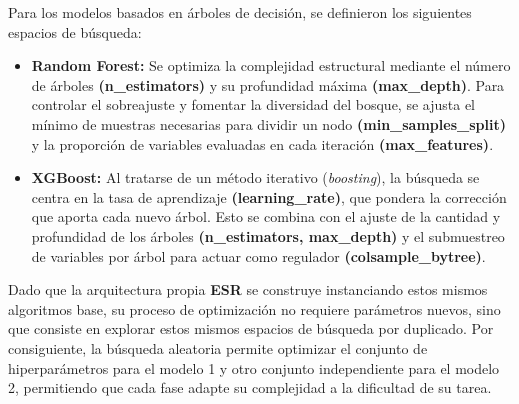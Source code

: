 Para los modelos basados en árboles de decisión, se definieron los siguientes espacios de búsqueda:
\begin{itemize}
	\item \textbf{Random Forest:} Se optimiza la complejidad estructural mediante el número de árboles \textbf{(n\_estimators)} y su profundidad máxima \textbf{(max\_depth)}. Para controlar el sobreajuste y fomentar la diversidad del bosque, se ajusta el mínimo de muestras necesarias para dividir un nodo \textbf{(min\_samples\_split)} y la proporción de variables evaluadas en cada iteración \textbf{(max\_features)}.
	\item \textbf{XGBoost:} Al tratarse de un método iterativo (\textit{boosting}), la búsqueda se centra en la tasa de aprendizaje \textbf{(learning\_rate)}, que pondera la corrección que aporta cada nuevo árbol. Esto se combina con el ajuste de la cantidad y profundidad de los árboles \textbf{(n\_estimators, max\_depth)} y el submuestreo de variables por árbol para actuar como regulador \textbf{(colsample\_bytree)}.
\end{itemize}
Dado que la arquitectura propia \textbf{ESR} se construye instanciando estos mismos algoritmos base, su proceso de optimización no requiere parámetros nuevos, sino que consiste en explorar estos mismos espacios de búsqueda por duplicado. Por consiguiente, la búsqueda aleatoria permite optimizar el conjunto de hiperparámetros para el modelo 1 y otro conjunto independiente para el modelo 2, permitiendo que cada fase adapte su complejidad a la dificultad de su tarea.


